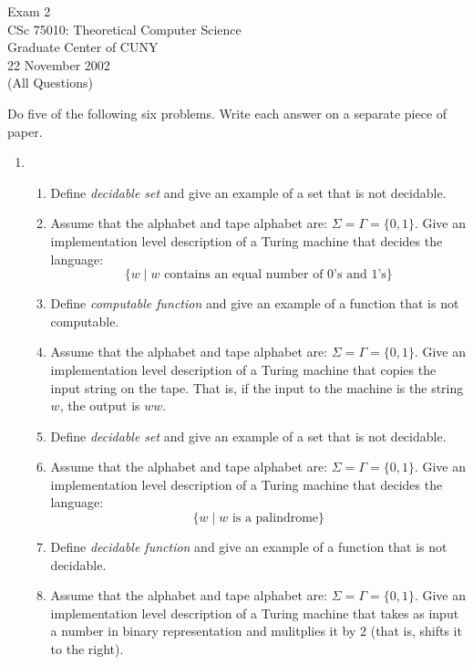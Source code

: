 \documentclass[11pt]{article}
\begin{document}
\begin{center}
	Exam 2\\
        	CSc 75010: Theoretical Computer Science\\
        	Graduate Center of CUNY\\
	22 November 2002\\
        	(All Questions)
\end{center}

Do five of the following six problems.  Write each answer on a separate
piece of paper.


\begin{enumerate}
\item
\begin{enumerate}
	\item Define {\em decidable set} and give an example of a set that is not decidable.
	\item Assume that the alphabet and tape alphabet are: 
		$\Sigma = \Gamma = \{0,1\}$.
		Give an implementation level description of a Turing machine that
		decides the language: 
		$$
			\{w\mid \mbox{$w$ contains an equal number of 0's and 1's}\}
		$$

	\item Define {\em computable function} and give an example of a function that is not computable.
	\item Assume that the alphabet and tape alphabet are:  $\Sigma = \Gamma = \{0,1\}$.
		Give an implementation level description of a Turing machine that
		copies the input string on the tape.  That is, if the input to the machine
		is the string $w$, the output is $ww$.

	\item Define {\em decidable set} and give an example of a set
		that is not decidable.
	\item Assume that the alphabet and tape alphabet are: $\Sigma = \Gamma = \{0,1\}$.
		Give an implementation level description of a Turing machine that
		decides the language: 
		$$
			\{w\mid \mbox{$w$ is a palindrome}\}
		$$

	\item Define {\em decidable function} and give an example of a function
		that is not decidable.
	\item Assume that the alphabet and tape alphabet are: 
		$\Sigma = \Gamma = \{0,1\}$.
		Give an implementation level description of a Turing machine that
		takes as input a number in binary representation and mulitplies it
		by 2 (that is, shifts it to the right).


\end{enumerate}
\end{enumerate}
\end{document}

